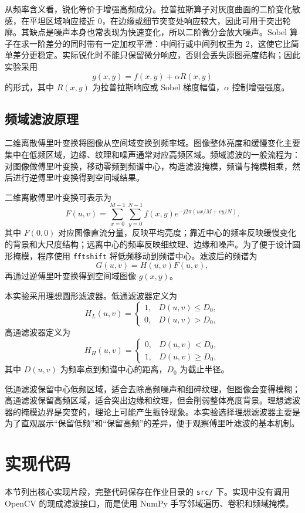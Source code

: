 \documentclass[bwprint]{report}
\begin{document}
从频率含义看，锐化等价于增强高频成分。拉普拉斯算子对灰度曲面的二阶变化敏感，在平坦区域响应接近 0，在边缘或细节突变处响应较大，因此可用于突出轮廓。其缺点是噪声本身也常表现为快速变化，所以二阶微分会放大噪声。Sobel 算子在求一阶差分的同时带有一定加权平滑：中间行或中间列权重为 2，这使它比简单差分更稳定。实际锐化时不能只保留微分响应，否则会丢失原图亮度结构；因此实验采用
\[
g(x,y)=f(x,y)+\alpha R(x,y)
\]
的形式，其中 $R(x,y)$ 为拉普拉斯响应或 Sobel 梯度幅值，$\alpha$ 控制增强强度。

\subsection{频域滤波原理}
二维离散傅里叶变换将图像从空间域变换到频率域。图像整体亮度和缓慢变化主要集中在低频区域，边缘、纹理和噪声通常对应高频区域。频域滤波的一般流程为：对图像做傅里叶变换，移动零频到频谱中心，构造滤波掩模，频谱与掩模相乘，然后进行逆傅里叶变换得到空间域结果。

二维离散傅里叶变换可表示为
\[
F(u,v)=\sum_{x=0}^{M-1}\sum_{y=0}^{N-1}f(x,y)e^{-j2\pi(ux/M+vy/N)}.
\]
其中 $F(0,0)$ 对应图像直流分量，反映平均亮度；靠近中心的频率反映缓慢变化的背景和大尺度结构；远离中心的频率反映细纹理、边缘和噪声。为了便于设计圆形掩模，程序使用 \texttt{fftshift} 将低频移动到频谱中心。滤波后的频谱为
\[
G(u,v)=H(u,v)F(u,v),
\]
再通过逆傅里叶变换得到空间域图像 $g(x,y)$。

本实验采用理想圆形滤波器。低通滤波器定义为
\[
H_L(u,v)=
\begin{cases}
1, & D(u,v)\le D_0,\\
0, & D(u,v)>D_0,
\end{cases}
\]
高通滤波器定义为
\[
H_H(u,v)=
\begin{cases}
0, & D(u,v)<D_0,\\
1, & D(u,v)\ge D_0,
\end{cases}
\]
其中 $D(u,v)$ 为频率点到频谱中心的距离，$D_0$ 为截止半径。

低通滤波保留中心低频区域，适合去除高频噪声和细碎纹理，但图像会变得模糊；高通滤波保留高频区域，适合突出边缘和纹理，但会削弱整体亮度背景。理想滤波器的掩模边界是突变的，理论上可能产生振铃现象。本实验选择理想滤波器主要是为了直观展示“保留低频”和“保留高频”的差异，便于观察傅里叶滤波的基本机制。

\section{实现代码}
本节列出核心实现片段，完整代码保存在作业目录的 \texttt{src/} 下。实现中没有调用 OpenCV 的现成滤波接口，而是使用 NumPy 手写邻域遍历、卷积和频域掩模。
\end{document}
